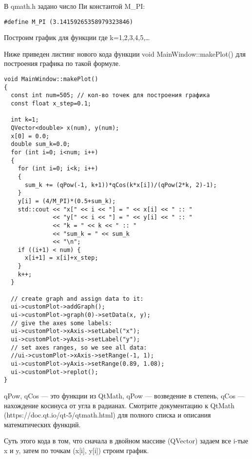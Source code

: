 В qmath.h задано число Пи константой M\_PI:
\begin{verbatim}
#define M_PI (3.14159265358979323846)
\end{verbatim}

Построим график для функции
где k=1,2,3,4,5,…

Ниже приведен листинг нового кода функции void MainWindow::makePlot() для построения графика по такой формуле.

\begin{verbatim}
void MainWindow::makePlot()
{
  const int num=505; // кол-во точек для построения графика
  const float x_step=0.1;

  int k=1;
  QVector<double> x(num), y(num);
  x[0] = 0.0;
  double sum_k=0.0;
  for (int i=0; i<num; i++)
  {
    for (int i=0; i<k; i++)
    {
      sum_k += (qPow(-1, k+1))*qCos(k*x[i])/(qPow(2*k, 2)-1);
    }
    y[i] = (4/M_PI)*(0.5+sum_k);
    std::cout << "x[" << i << "] = " << x[i] << " :: "
              << "y[" << i << "] = " << y[i] << " :: "
              << "k = " << k << " :: "
              << "sum_k = " << sum_k
              << "\n";
    if ((i+1) < num) {
      x[i+1] = x[i]+x_step;
    }
    k++;
  }

  // create graph and assign data to it:
  ui->customPlot->addGraph();
  ui->customPlot->graph(0)->setData(x, y);
  // give the axes some labels:
  ui->customPlot->xAxis->setLabel("x");
  ui->customPlot->yAxis->setLabel("y");
  // set axes ranges, so we see all data:
  //ui->customPlot->xAxis->setRange(-1, 1);
  ui->customPlot->yAxis->setRange(0.89, 1.08);
  ui->customPlot->replot();
}
\end{verbatim}

qPow, qCos — это функции из QtMath, qPow — возведение в степень, qCos — нахождение косинуса от угла в радианах. Смотрите документацию к QtMath (https://doc.qt.io/qt-5/qtmath.html) для полного списка и описания математических функций.

Суть этого кода в том, что сначала в двойном массиве (QVector) задаем все i-тые x и y, затем по точкам (x[i], y[i]) строим график.


\clearpage
